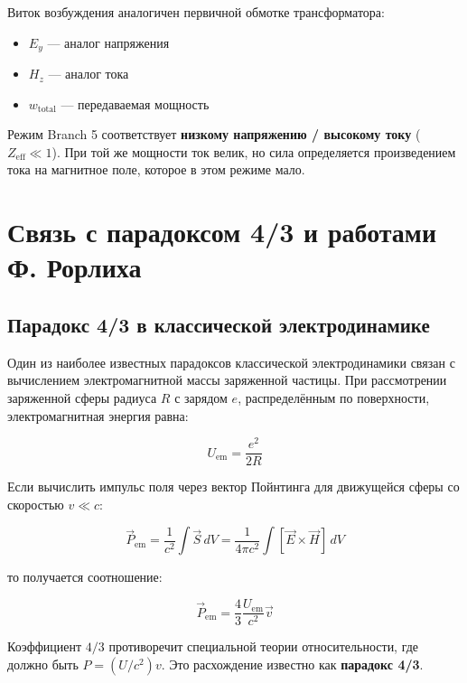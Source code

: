 \documentclass[a4paper,12pt]{article}
\begin{document}
Виток возбуждения аналогичен первичной обмотке трансформатора:
\begin{itemize}
    \item $E_y$ --- аналог напряжения
    \item $H_z$ --- аналог тока
    \item $w_{\text{total}}$ --- передаваемая мощность
\end{itemize}

Режим Branch 5 соответствует \textbf{низкому напряжению / высокому току} 
($Z_{\text{eff}} \ll 1$). При той же мощности ток велик, но сила определяется
произведением тока на магнитное поле, которое в этом режиме мало.

\section{Связь с парадоксом 4/3 и работами Ф. Рорлиха}

\subsection{Парадокс 4/3 в классической электродинамике}

Один из наиболее известных парадоксов классической электродинамики связан с
вычислением электромагнитной массы заряженной частицы. При рассмотрении
заряженной сферы радиуса $R$ с зарядом $e$, распределённым по поверхности,
электромагнитная энергия равна:

\begin{equation}
U_{\text{em}} = \frac{e^2}{2R}
\label{eq:em_energy}
\end{equation}

Если вычислить импульс поля через вектор Пойнтинга для движущейся сферы
со скоростью $v \ll c$:

\begin{equation}
\vec{P}_{\text{em}} = \frac{1}{c^2} \int \vec{S} \, dV
= \frac{1}{4\pi c^2} \int [\vec{E} \times \vec{H}] \, dV
\label{eq:poynting_momentum}
\end{equation}

то получается соотношение:

\begin{equation}
\vec{P}_{\text{em}} = \frac{4}{3} \frac{U_{\text{em}}}{c^2} \vec{v}
\label{eq:4/3_paradox}
\end{equation}

Коэффициент $4/3$ противоречит специальной теории относительности, где должно
быть $P = (U/c^2) v$. Это расхождение известно как \textbf{парадокс 4/3}.
\end{document}

